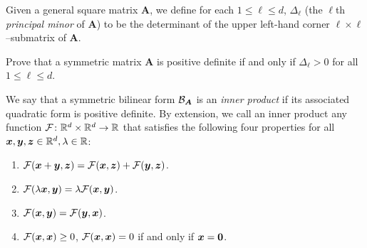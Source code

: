 \begin{problem}\label{problem:PrincipalMinors}
Given a general square matrix $\boldsymbol{A}$, we define for each $1\leq \ell \leq d$, $\Delta_\ell$ (the $\ell$th \emph{principal minor} of $\boldsymbol{A}$) to be the determinant of the upper left-hand corner $\ell \times \ell$--submatrix of $\boldsymbol{A}$.  
\begin{center}
\end{center}
Prove that a symmetric matrix $\boldsymbol{A}$ is positive definite if and only if $\Delta_\ell > 0$ for all $1\leq \ell \leq d$.
\end{problem}

\begin{example}\label{example:innerprod}
We say that a symmetric bilinear form $\mathcal{B}_{\boldsymbol{A}}$ is an \emph{inner product} if its associated quadratic form is positive definite.  By extension, we call an inner product any function $\mathcal{F} \colon \mathbb{R}^d \times \mathbb{R}^d \to \mathbb{R}$ that satisfies the following four properties for all $\boldsymbol{x}, \boldsymbol{y}, \boldsymbol{z} \in \mathbb{R}^d, \lambda \in \mathbb{R}$:
\begin{enumerate}
\item $\mathcal{F}(\boldsymbol{x}+\boldsymbol{y}, \boldsymbol{z}) = \mathcal{F}(\boldsymbol{x}, \boldsymbol{z}) + \mathcal{F}(\boldsymbol{y}, \boldsymbol{z})$.
\item $\mathcal{F}(\lambda \boldsymbol{x}, \boldsymbol{y}) = \lambda \mathcal{F}(\boldsymbol{x}, \boldsymbol{y})$.
\item $\mathcal{F}(\boldsymbol{x}, \boldsymbol{y}) = \mathcal{F}(\boldsymbol{y}, \boldsymbol{x})$.
\item $\mathcal{F}(\boldsymbol{x}, \boldsymbol{x}) \geq 0$, $\mathcal{F}(\boldsymbol{x}, \boldsymbol{x}) = 0$ if and only if $\boldsymbol{x} = \boldsymbol{0}$.
\end{enumerate}
\end{example}

